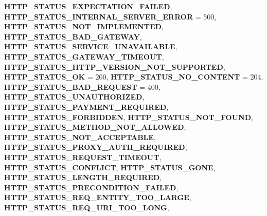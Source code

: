 \begin{DoxyCompactItemize}
{\bfseries H\+T\+T\+P\+\_\+\+S\+T\+A\+T\+U\+S\+\_\+\+E\+X\+P\+E\+C\+T\+A\+T\+I\+O\+N\+\_\+\+F\+A\+I\+L\+ED}, 
{\bfseries H\+T\+T\+P\+\_\+\+S\+T\+A\+T\+U\+S\+\_\+\+I\+N\+T\+E\+R\+N\+A\+L\+\_\+\+S\+E\+R\+V\+E\+R\+\_\+\+E\+R\+R\+OR} = 500, 
{\bfseries H\+T\+T\+P\+\_\+\+S\+T\+A\+T\+U\+S\+\_\+\+N\+O\+T\+\_\+\+I\+M\+P\+L\+E\+M\+E\+N\+T\+ED}, 
\newline
{\bfseries H\+T\+T\+P\+\_\+\+S\+T\+A\+T\+U\+S\+\_\+\+B\+A\+D\+\_\+\+G\+A\+T\+E\+W\+AY}, 
{\bfseries H\+T\+T\+P\+\_\+\+S\+T\+A\+T\+U\+S\+\_\+\+S\+E\+R\+V\+I\+C\+E\+\_\+\+U\+N\+A\+V\+A\+I\+L\+A\+B\+LE}, 
{\bfseries H\+T\+T\+P\+\_\+\+S\+T\+A\+T\+U\+S\+\_\+\+G\+A\+T\+E\+W\+A\+Y\+\_\+\+T\+I\+M\+E\+O\+UT}, 
{\bfseries H\+T\+T\+P\+\_\+\+S\+T\+A\+T\+U\+S\+\_\+\+H\+T\+T\+P\+\_\+\+V\+E\+R\+S\+I\+O\+N\+\_\+\+N\+O\+T\+\_\+\+S\+U\+P\+P\+O\+R\+T\+ED}, 
\newline
{\bfseries H\+T\+T\+P\+\_\+\+S\+T\+A\+T\+U\+S\+\_\+\+OK} = 200, 
{\bfseries H\+T\+T\+P\+\_\+\+S\+T\+A\+T\+U\+S\+\_\+\+N\+O\+\_\+\+C\+O\+N\+T\+E\+NT} = 204, 
{\bfseries H\+T\+T\+P\+\_\+\+S\+T\+A\+T\+U\+S\+\_\+\+B\+A\+D\+\_\+\+R\+E\+Q\+U\+E\+ST} = 400, 
{\bfseries H\+T\+T\+P\+\_\+\+S\+T\+A\+T\+U\+S\+\_\+\+U\+N\+A\+U\+T\+H\+O\+R\+I\+Z\+ED}, 
\newline
{\bfseries H\+T\+T\+P\+\_\+\+S\+T\+A\+T\+U\+S\+\_\+\+P\+A\+Y\+M\+E\+N\+T\+\_\+\+R\+E\+Q\+U\+I\+R\+ED}, 
{\bfseries H\+T\+T\+P\+\_\+\+S\+T\+A\+T\+U\+S\+\_\+\+F\+O\+R\+B\+I\+D\+D\+EN}, 
{\bfseries H\+T\+T\+P\+\_\+\+S\+T\+A\+T\+U\+S\+\_\+\+N\+O\+T\+\_\+\+F\+O\+U\+ND}, 
{\bfseries H\+T\+T\+P\+\_\+\+S\+T\+A\+T\+U\+S\+\_\+\+M\+E\+T\+H\+O\+D\+\_\+\+N\+O\+T\+\_\+\+A\+L\+L\+O\+W\+ED}, 
\newline
{\bfseries H\+T\+T\+P\+\_\+\+S\+T\+A\+T\+U\+S\+\_\+\+N\+O\+T\+\_\+\+A\+C\+C\+E\+P\+T\+A\+B\+LE}, 
{\bfseries H\+T\+T\+P\+\_\+\+S\+T\+A\+T\+U\+S\+\_\+\+P\+R\+O\+X\+Y\+\_\+\+A\+U\+T\+H\+\_\+\+R\+E\+Q\+U\+I\+R\+ED}, 
{\bfseries H\+T\+T\+P\+\_\+\+S\+T\+A\+T\+U\+S\+\_\+\+R\+E\+Q\+U\+E\+S\+T\+\_\+\+T\+I\+M\+E\+O\+UT}, 
{\bfseries H\+T\+T\+P\+\_\+\+S\+T\+A\+T\+U\+S\+\_\+\+C\+O\+N\+F\+L\+I\+CT}, 
\newline
{\bfseries H\+T\+T\+P\+\_\+\+S\+T\+A\+T\+U\+S\+\_\+\+G\+O\+NE}, 
{\bfseries H\+T\+T\+P\+\_\+\+S\+T\+A\+T\+U\+S\+\_\+\+L\+E\+N\+G\+T\+H\+\_\+\+R\+E\+Q\+U\+I\+R\+ED}, 
{\bfseries H\+T\+T\+P\+\_\+\+S\+T\+A\+T\+U\+S\+\_\+\+P\+R\+E\+C\+O\+N\+D\+I\+T\+I\+O\+N\+\_\+\+F\+A\+I\+L\+ED}, 
{\bfseries H\+T\+T\+P\+\_\+\+S\+T\+A\+T\+U\+S\+\_\+\+R\+E\+Q\+\_\+\+E\+N\+T\+I\+T\+Y\+\_\+\+T\+O\+O\+\_\+\+L\+A\+R\+GE}, 
\newline
{\bfseries H\+T\+T\+P\+\_\+\+S\+T\+A\+T\+U\+S\+\_\+\+R\+E\+Q\+\_\+\+U\+R\+I\+\_\+\+T\+O\+O\+\_\+\+L\+O\+NG}, 

\end{DoxyCompactItemize}
